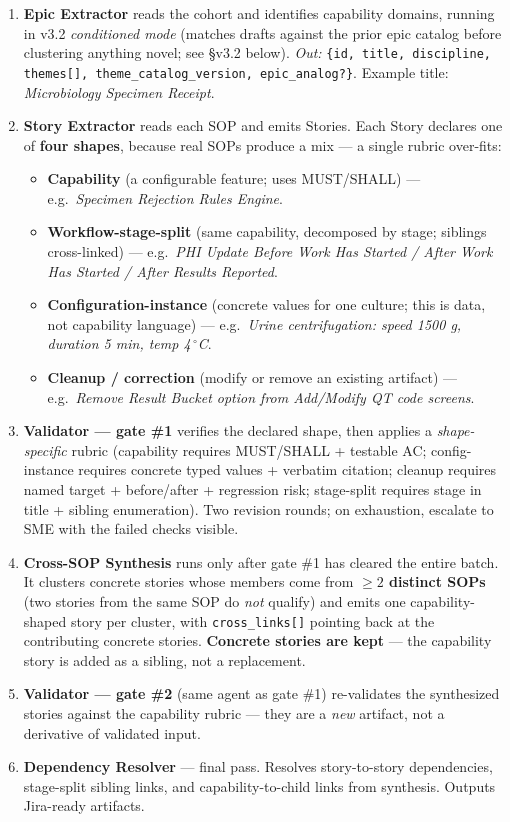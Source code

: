 \documentclass[10.5pt,letterpaper]{article}
\begin{document}
\begin{enumerate}
  \item \textbf{Epic Extractor} reads the cohort and identifies capability domains, running in v3.2 \emph{conditioned mode} (matches drafts against the prior epic catalog before clustering anything novel; see \S v3.2 below). \emph{Out:} \texttt{\{id, title, discipline, themes[], theme\_catalog\_version, epic\_analog?\}}. Example title: \emph{Microbiology Specimen Receipt}.
  \item \textbf{Story Extractor} reads each SOP and emits Stories. Each Story declares one of \textbf{four shapes}, because real SOPs produce a mix --- a single rubric over-fits:
    \begin{itemize}
      \item \textbf{Capability} (a configurable feature; uses MUST/SHALL) --- e.g.\ \emph{Specimen Rejection Rules Engine}.
      \item \textbf{Workflow-stage-split} (same capability, decomposed by stage; siblings cross-linked) --- e.g.\ \emph{PHI Update Before Work Has Started / After Work Has Started / After Results Reported}.
      \item \textbf{Configuration-instance} (concrete values for one culture; this is data, not capability language) --- e.g.\ \emph{Urine centrifugation: speed 1500 g, duration 5 min, temp 4\,$^\circ$C}.
      \item \textbf{Cleanup / correction} (modify or remove an existing artifact) --- e.g.\ \emph{Remove Result Bucket option from Add/Modify QT code screens}.
    \end{itemize}
  \item \textbf{Validator --- gate \#1} verifies the declared shape, then applies a \emph{shape-specific} rubric (capability requires MUST/SHALL + testable AC; config-instance requires concrete typed values + verbatim citation; cleanup requires named target + before/after + regression risk; stage-split requires stage in title + sibling enumeration). Two revision rounds; on exhaustion, escalate to SME with the failed checks visible.
  \item \textbf{Cross-SOP Synthesis} runs only after gate \#1 has cleared the entire batch. It clusters concrete stories whose members come from \textbf{$\geq 2$ distinct SOPs} (two stories from the same SOP do \emph{not} qualify) and emits one capability-shaped story per cluster, with \texttt{cross\_links[]} pointing back at the contributing concrete stories. \textbf{Concrete stories are kept} --- the capability story is added as a sibling, not a replacement.
  \item \textbf{Validator --- gate \#2} (same agent as gate \#1) re-validates the synthesized stories against the capability rubric --- they are a \emph{new} artifact, not a derivative of validated input.
  \item \textbf{Dependency Resolver} --- final pass. Resolves story-to-story dependencies, stage-split sibling links, and capability-to-child links from synthesis. Outputs Jira-ready artifacts.
\end{enumerate}
\end{document}
